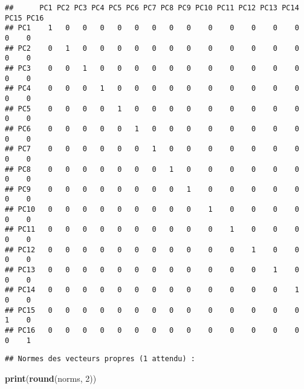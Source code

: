 \documentclass[
]{article}
\newenvironment{Shaded}{\begin{snugshade}}{\end{snugshade}}
\newcommand{\ControlFlowTok}[1]{\textcolor[rgb]{0.13,0.29,0.53}{\textbf{#1}}}
\newcommand{\DecValTok}[1]{\textcolor[rgb]{0.00,0.00,0.81}{#1}}
\newcommand{\FunctionTok}[1]{\textcolor[rgb]{0.13,0.29,0.53}{\textbf{#1}}}
\newcommand{\NormalTok}[1]{#1}
\newcommand{\OtherTok}[1]{\textcolor[rgb]{0.56,0.35,0.01}{#1}}
\newcommand{\SpecialCharTok}[1]{\textcolor[rgb]{0.81,0.36,0.00}{\textbf{#1}}}
\newcommand{\StringTok}[1]{\textcolor[rgb]{0.31,0.60,0.02}{#1}}
\begin{document}
\begin{verbatim}
##      PC1 PC2 PC3 PC4 PC5 PC6 PC7 PC8 PC9 PC10 PC11 PC12 PC13 PC14 PC15 PC16
## PC1    1   0   0   0   0   0   0   0   0    0    0    0    0    0    0    0
## PC2    0   1   0   0   0   0   0   0   0    0    0    0    0    0    0    0
## PC3    0   0   1   0   0   0   0   0   0    0    0    0    0    0    0    0
## PC4    0   0   0   1   0   0   0   0   0    0    0    0    0    0    0    0
## PC5    0   0   0   0   1   0   0   0   0    0    0    0    0    0    0    0
## PC6    0   0   0   0   0   1   0   0   0    0    0    0    0    0    0    0
## PC7    0   0   0   0   0   0   1   0   0    0    0    0    0    0    0    0
## PC8    0   0   0   0   0   0   0   1   0    0    0    0    0    0    0    0
## PC9    0   0   0   0   0   0   0   0   1    0    0    0    0    0    0    0
## PC10   0   0   0   0   0   0   0   0   0    1    0    0    0    0    0    0
## PC11   0   0   0   0   0   0   0   0   0    0    1    0    0    0    0    0
## PC12   0   0   0   0   0   0   0   0   0    0    0    1    0    0    0    0
## PC13   0   0   0   0   0   0   0   0   0    0    0    0    1    0    0    0
## PC14   0   0   0   0   0   0   0   0   0    0    0    0    0    1    0    0
## PC15   0   0   0   0   0   0   0   0   0    0    0    0    0    0    1    0
## PC16   0   0   0   0   0   0   0   0   0    0    0    0    0    0    0    1
\end{verbatim}

\begin{Shaded}
\end{Shaded}

\begin{verbatim}
## Normes des vecteurs propres (1 attendu) :
\end{verbatim}

\begin{Shaded}
\begin{Highlighting}[]
\FunctionTok{print}\NormalTok{(}\FunctionTok{round}\NormalTok{(norms, }\DecValTok{2}\NormalTok{))}
\end{Highlighting}
\end{Shaded}
\end{document}
